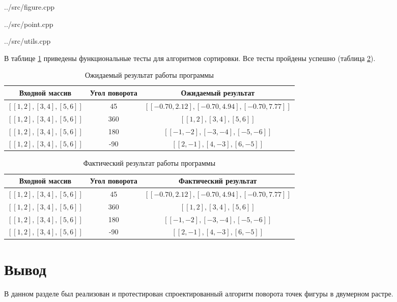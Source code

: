 \begin{lstinputlisting}[
	caption={Многопоточная функция поворота фигуры},
	label={lst:figure},
	style={cpp},
	linerange={28-51},
	]{../src/figure.cpp}
\end{lstinputlisting}

\begin{lstinputlisting}[
	caption={Функция поворота точки отностельно другой},
	label={lst:point},
	style={cpp},
	linerange={26-33},
	]{../src/point.cpp}
\end{lstinputlisting}

\clearpage

\begin{lstinputlisting}[
	caption={Функция для замера тиков процессора},
	label={lst:utils},
	style={cpp},
	linerange={3-15},
	]{../src/utils.cpp}
\end{lstinputlisting}


В таблице \ref{tabular:func_test} приведены функциональные тесты для алгоритмов сортировки. Все тесты пройдены успешно (таблица \ref{tabular:func_test_res}).


\begin{table}[h!]
	\begin{center}
		\caption{\label{tabular:func_test}Ожидаемый результат работы программы}
		\begin{tabular}{|c|c|c|}
			\hline
			Входной массив & Угол поворота & Ожидаемый результат \\ 
			\hline
			$[[1,2], [3,4], [5,6]]$ & 45 & $[[-0.70, 2.12], [-0.70, 4.94], [-0.70, 7.77]]$\\\hline
			$[[1,2], [3,4], [5,6]]$ & 360 & $[[1,2], [3,4], [5,6]]$\\\hline
			$[[1,2], [3,4], [5,6]]$ & 180 & $[[-1,-2], [-3,-4], [-5,-6]]$\\\hline
			$[[1,2], [3,4], [5,6]]$ & -90 & $[[2,-1], [4,-3], [6,-5]]$\\\hline
		\end{tabular}
	\end{center}
\end{table}

\begin{table}[h!]
	\begin{center}
		\caption{\label{tabular:func_test_res}Фактический результат работы программы}
		\begin{tabular}{|c|c|c|}
			\hline
			Входной массив & Угол поворота & Фактический результат \\ 
			\hline
			$[[1,2], [3,4], [5,6]]$ & 45 & $[[-0.70, 2.12], [-0.70, 4.94], [-0.70, 7.77]]$\\\hline
			$[[1,2], [3,4], [5,6]]$ & 360 & $[[1,2], [3,4], [5,6]]$\\\hline
			$[[1,2], [3,4], [5,6]]$ & 180 & $[[-1,-2], [-3,-4], [-5,-6]]$\\\hline
			$[[1,2], [3,4], [5,6]]$ & -90 & $[[2,-1], [4,-3], [6,-5]]$\\\hline
		\end{tabular}
	\end{center}
\end{table}


\captionsetup{singlelinecheck = false, justification=centering}

\section{Вывод}

В данном разделе был реализован и протестирован спроектированный алгоритм поворота точек фигуры в двумерном растре.
